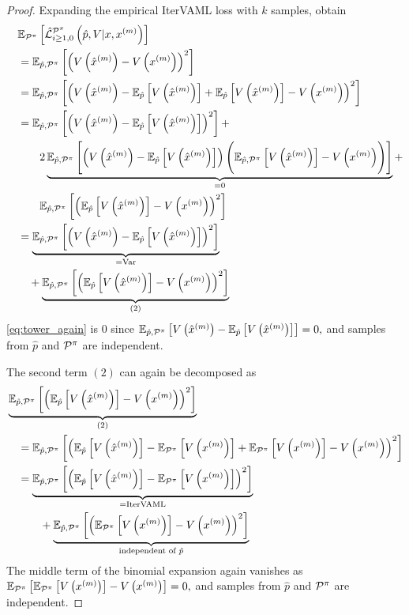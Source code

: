 \begin{proof}
Expanding the empirical IterVAML loss with $k$ samples, obtain
\begin{align}
   & \EEX{\P^\pi}{\hat{\mathcal{L}}^{\P^\pi}_{i\geq1,0}\left(\hat{p},V|x,x^{(m)}\right)} \\
   \quad & =  \EEX{\hat{p},\P^\pi}{\left(\muV{m} - V\left(x^{(m)}\right)\right)^2} \\
   \quad & =  \EEX{\hat{p},\P^\pi}{\left(\muV{m} - \EEX{\hat{p}}{\muV{m}} + \EEX{\hat{p}}{\muV{m}} - V\left(x^{(m)}\right)\right)^2} \\
   \quad & =  \EEX{\hat{p},\P^\pi}{\left(\muV{m} - \EEX{\hat{p}}{V\left(\hat{x}^{(m)}\right)}\right)^2} + \\ 
   \quad &  \quad \quad  2 \underbrace{\EEX{\hat{p},\P^\pi}{\roundb{\muV{m} - \EEX{\hat{p}}{V\left(\hat{x}^{(m)}\right)}}\Biggl(\EEX{\hat{p},\P^\pi}{V\left(\hat{x}^{(m)}\right)} - V\left(x^{(m)}\right)\Biggr)}}_{=0} + \label{eq:tower_again}\\
   \quad &  \quad \quad  \EEX{\hat{p},\P^\pi}{\left(\EEX{\hat{p}}{V\left(\hat{x}^{(m)}\right)} - V\left(x^{(m)}\right)\right)^2}\\
   \quad & =  \underbrace{\EEX{\hat{p},\P^\pi}{\left(V\left(\hat{x}^{(m)}\right) - \EEX{\hat{p}}{V\left(\hat{x}^{(m)}\right)}\right)^2}}_{= \mathrm{Var}} \\
   \quad & \quad + \underbrace{\EEX{\hat{p},\P^\pi}{\left(\EEX{\hat{p}}{V\left(\hat{x}^{(m)}\right)} - V\left(x^{(m)}\right)\right)^2}}_{(2)}
\end{align}
\autoref{eq:tower_again} is $0$ since $\EEX{\hat{p},\P^\pi}{\muV{m} - \EEX{\hat{p}}{V\left(\hat{x}^{(m)}\right)}} = 0,$ and samples from $\hat{p}$ and $\P^\pi$ are independent.

The second term $(2)$ can again be decomposed as
\begin{align}
   &\underbrace{\EEX{\hat{p},\P^\pi}{\left(\EEX{\hat{p}}{V\left(\hat{x}^{(m)}\right)} - V\left(x^{(m)}\right)\right)^2}}_{(2)} \\
   &\quad=\EEX{\hat{p},\P^\pi}{\left(\EEX{\hat{p}}{V\left(\hat{x}^{(m)}\right)} - \EEX{\P^\pi}{V\left(x^{(m)}\right)} + \EEX{\P^\pi}{V\left(x^{(m)}\right)} - V\left(x^{(m)}\right)\right)^2} \\
   &\quad=\underbrace{\EEX{\hat{p},\P^\pi}{\left(\EEX{\hat{p}}{V\left(\hat{x}^{(m)}\right)} - \EEX{\P^\pi}{V\left(x^{(m)}\right)}\right)^2}}_{= \mathrm{IterVAML}}\\
   &\quad \quad\quad + \underbrace{\EEX{\hat{p},\P^\pi}{\left(\EEX{\P^\pi}{V\left(x^{(m)}\right)} - V\left(x^{(m)}\right)\right)^2}}_{\text{independent of }\hat{p}}
\end{align}
The middle term of the binomial expansion again vanishes as $\EEX{\P^\pi}{\EEX{\P^\pi}{V\left(x^{(m)}\right)} - V\left(x^{(m)}\right)} \allowbreak = 0,$ and samples from $\hat{p}$ and $\P^\pi$ are independent.


\end{proof}
